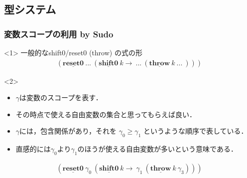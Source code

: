 \documentclass[dvipdfmx,cjk,xcolor=dvipsnames,envcountsect,notheorems,12pt]{beamer}
\newcommand\cResetz{\underline{\textbf{reset0}}}
\newcommand\cShiftz{\underline{\textbf{shift0}}}
\newcommand\cThrow{\underline{\textbf{throw}}}
\newcommand\ord{\ge}
\theoremstyle{definition}
\begin{document}
\subsection{型システム}
\begin{frame}
  \frametitle{変数スコープの利用 by Sudo}
  \begin{onlyenv}<1>
    一般的なshift0/reset0 (throw) の式の形
    \begin{align*}
      (\cResetz ~...~ (\cShiftz ~k \to ~...~ (\cThrow ~k ~...~)))
    \end{align*}
  \end{onlyenv}

  \begin{onlyenv}<2>
    \begin{itemize}
    \item $\gamma$は変数のスコープを表す．
    \item その時点で使える自由変数の集合と思ってもらえば良い．
    \item $\gamma$には，包含関係があり，それを $\gamma_0 \ord \gamma_1$ というような順序で表している．
    \item 直感的には$\gamma_0$より$\gamma_1$のほうが使える自由変数が多いという意味である．
    \end{itemize}

    \begin{align*}
      (\cResetz ~\gamma_0~ (\cShiftz ~k \to ~\gamma_1~ (\cThrow ~k ~\gamma_3)))
    \end{align*}
  \end{onlyenv}
\end{frame}
\end{document}
